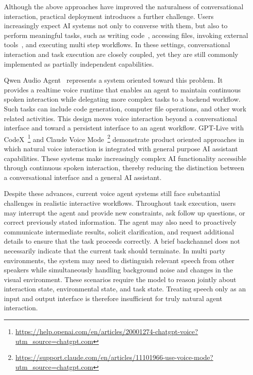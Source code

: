 Although the above approaches have improved the naturalness of conversational interaction, practical deployment introduces a further challenge. Users increasingly expect AI systems not only to converse with them, but also to perform meaningful tasks, such as writing code~\cite{glm5}, accessing files, invoking external tools~\cite{voxmind}, and executing multi step workflows. In these settings, conversational interaction and task execution are closely coupled, yet they are still commonly implemented as partially independent capabilities.

Qwen Audio Agent~\cite{qwen_audio_agent_2026} represents a system oriented toward this problem. It provides a realtime voice runtime that enables an agent to maintain continuous spoken interaction while delegating more complex tasks to a backend workflow. Such tasks can include code generation, computer file operations, and other work related activities. This design moves voice interaction beyond a conversational interface and toward a persistent interface to an agent workflow. GPT-Live with CodeX~\footnote{\url{https://help.openai.com/en/articles/20001274-chatgpt-voice?utm_source=chatgpt.com}} and Claude Voice Mode~\footnote{\url{https://support.claude.com/en/articles/11101966-use-voice-mode?utm_source=chatgpt.com}} demonstrate product oriented approaches in which natural voice interaction is integrated with general purpose AI assistant capabilities. These systems make increasingly complex AI functionality accessible through continuous spoken interaction, thereby reducing the distinction between a conversational interface and a general AI assistant.

Despite these advances, current voice agent systems still face substantial challenges in realistic interactive workflows. Throughout task execution, users may interrupt the agent and provide new constraints, ask follow up questions, or correct previously stated information. The agent may also need to proactively communicate intermediate results, solicit clarification, and request additional details to ensure that the task proceeds correctly. A brief backchannel does not necessarily indicate that the current task should terminate. In multi party environments, the system may need to distinguish relevant speech from other speakers while simultaneously handling background noise and changes in the visual environment. These scenarios require the model to reason jointly about interaction state, environmental state, and task state. Treating speech only as an input and output interface is therefore insufficient for truly natural agent interaction.


